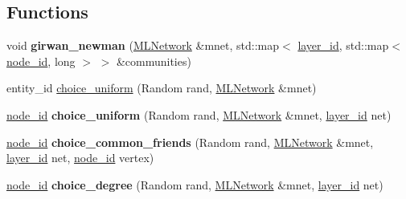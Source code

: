 \subsection*{Functions}
\begin{DoxyCompactItemize}
\item 
\hypertarget{namespacemlnet_abb09784aac230fec8b1d2aa37278de7f}{void {\bfseries girwan\+\_\+newman} (\hyperlink{classmlnet_1_1_m_l_network}{M\+L\+Network} \&mnet, std\+::map$<$ \hyperlink{namespacemlnet_a84ad9c6056f0eb7d129995351f9b13fb}{layer\+\_\+id}, std\+::map$<$ \hyperlink{namespacemlnet_a4c354f08ca868982bf3ddae882ff71c6}{node\+\_\+id}, long $>$ $>$ \&communities)}\label{namespacemlnet_abb09784aac230fec8b1d2aa37278de7f}

\item 
entity\+\_\+id \hyperlink{namespacemlnet_adfaf99de2fa770d34c3ef57cc4420a3f}{choice\+\_\+uniform} (Random rand, \hyperlink{classmlnet_1_1_m_l_network}{M\+L\+Network} \&mnet)
\item 
\hypertarget{namespacemlnet_aa63606c3c7ab8b69a0196c2cc4267eb2}{\hyperlink{namespacemlnet_a4c354f08ca868982bf3ddae882ff71c6}{node\+\_\+id} {\bfseries choice\+\_\+uniform} (Random rand, \hyperlink{classmlnet_1_1_m_l_network}{M\+L\+Network} \&mnet, \hyperlink{namespacemlnet_a84ad9c6056f0eb7d129995351f9b13fb}{layer\+\_\+id} net)}\label{namespacemlnet_aa63606c3c7ab8b69a0196c2cc4267eb2}

\item 
\hypertarget{namespacemlnet_a295494c6027d62e98a6d1751ebf4f1e5}{\hyperlink{namespacemlnet_a4c354f08ca868982bf3ddae882ff71c6}{node\+\_\+id} {\bfseries choice\+\_\+common\+\_\+friends} (Random rand, \hyperlink{classmlnet_1_1_m_l_network}{M\+L\+Network} \&mnet, \hyperlink{namespacemlnet_a84ad9c6056f0eb7d129995351f9b13fb}{layer\+\_\+id} net, \hyperlink{namespacemlnet_a4c354f08ca868982bf3ddae882ff71c6}{node\+\_\+id} vertex)}\label{namespacemlnet_a295494c6027d62e98a6d1751ebf4f1e5}

\item 
\hypertarget{namespacemlnet_a45b859e04c224ed33708cf5636826306}{\hyperlink{namespacemlnet_a4c354f08ca868982bf3ddae882ff71c6}{node\+\_\+id} {\bfseries choice\+\_\+degree} (Random rand, \hyperlink{classmlnet_1_1_m_l_network}{M\+L\+Network} \&mnet, \hyperlink{namespacemlnet_a84ad9c6056f0eb7d129995351f9b13fb}{layer\+\_\+id} net)}\label{namespacemlnet_a45b859e04c224ed33708cf5636826306}


\end{DoxyCompactItemize}
